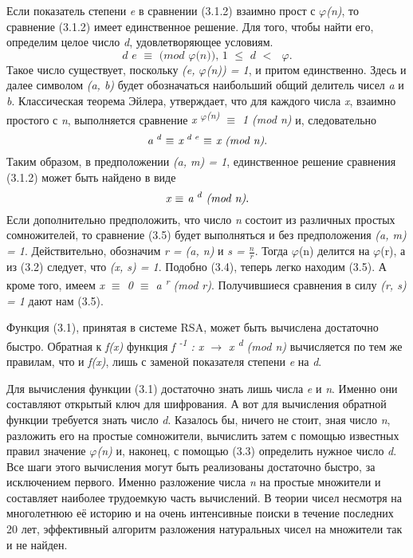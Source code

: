   Если показатель степени \textit{e} в сравнении (3.1.2) взаимно прост с \textit{{$\varphi$}(n)}, то сравнение (3.1.2) имеет единственное решение. 
Для того, чтобы найти его, определим целое число \textit{d}, удовлетворяющее условиям. 
\begin{equation}
 \textit{d e {$\equiv$} (mod {$\varphi$}(n)), 1 {$\leq$} d {$<$} {$\varphi$}}.
\end{equation}
Такое число существует, поскольку \textit{(e, {$\varphi$}(n)) = 1}, и притом единственно. Здесь и далее символом \textit{(a, b)} будет обозначаться 
наибольший общий делитель чисел \textit{a} и \textit{b}. Классическая теорема Эйлера, утверждает, что для каждого числа \textit{x}, взаимно простого 
с \textit{n}, выполняется сравнение \textit{x\textsuperscript{ {$\varphi$}(n)} {$\equiv$} 1 (mod n) } и, следовательно
\begin{equation}
 \textit{a\textsuperscript{ d} {$\equiv$} x\textsuperscript{ d e} {$\equiv$} x (mod n)}.
\end{equation}
Таким образом, в предположении \textit{(a, m) = 1}, единственное решение сравнения (3.1.2) может быть найдено в виде
\begin{equation}
 \textit{x {$\equiv$} a\textsuperscript{ d} (mod n)}.
\end{equation}
Если дополнительно предположить, что число \textit{n} состоит из различных простых сомножителей, то сравнение (3.5) будет выполняться и без 
предположения \textit{(a, m) = 1}. Действительно, обозначим \textit{r = (a, n)} и \textit{s = {$\frac{n}{r}$}}. Тогда {$\varphi$}(n) делится на {$\varphi$}(r), 
а из (3.2) следует, что \textit{(x, s) = 1}. Подобно (3.4), теперь легко находим (3.5). А кроме того, имеем \textit{x {$\equiv$} 0 {$\equiv$} a\textsuperscript{ r} (mod r)}. 
Получившиеся сравнения в силу \textit{(r, s) = 1} дают нам (3.5).

  Функция (3.1), принятая в системе RSA, может быть вычислена достаточно быстро. Обратная к \textit{f(x)} функция 
\textit{f\textsuperscript{ -1} : x {$\rightarrow$} x\textsuperscript{ d} (mod n) } вычисляется по тем же правилам, что и \textit{f(x)}, 
лишь с заменой показателя степени \textit{e} на \textit{d}.

  Для вычисления функции (3.1) достаточно знать лишь числа \textit{e} и \textit{n}. Именно они составляют открытый ключ для шифрования. 
А вот для вычисления обратной функции требуется знать число \textit{d}. Казалось бы, ничего не стоит, зная число \textit{n}, разложить 
его на простые сомножители, вычислить затем с помощью известных правил значение \textit{{$\varphi$}(n)} и, наконец, с помощью (3.3) определить 
нужное число \textit{d}. Все шаги этого вычисления могут быть реализованы достаточно быстро, за исключением первого. Именно разложение числа \textit{n} на 
простые множители и составляет наиболее трудоемкую часть вычислений. В теории чисел несмотря на многолетнюю её историю и на очень интенсивные поиски в течение последних 20 лет, 
эффективный алгоритм разложения натуральных чисел на множители так и не найден.

